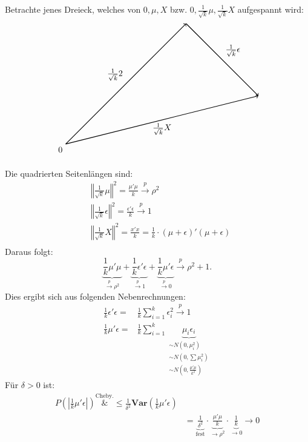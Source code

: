 \documentclass[10pt]{article}
\newcommand{\KW}{\overset{p} \longrightarrow} %
\newcommand{\Var}{\textbf{Var}} %
\begin{document}
	Betrachte jenes Dreieck, welches von $0, \mu, X$ bzw. $0, \frac{1}{\sqrt{k}} \mu, \frac{1}{\sqrt{k}} X$ aufgespannt wird:
	\begin{align*}
			\begin{tikzpicture}
			\draw[thick, ->] (0,0) node[below left] {0} -- node[midway, above left] {$\frac{1}{\sqrt{k}}\mu$} (5,5);
			\draw[thick, ->] (5,5) -- node[midway, above right] {$\frac{1}{\sqrt{k}}\epsilon$} (8,2);
			\draw[thick, ->] (0,0) -- node[midway, below] {$\frac{1}{\sqrt{k}}X$} (8,2);
		\end{tikzpicture}
	\end{align*}	
	
	Die quadrierten Seitenlängen sind:
	\begin{equation*}
		\begin{split}
			&\left\Vert \frac{1}{\sqrt{k}} \mu \right\Vert^2 = \frac{\mu'\mu}{k} \KW \rho^2\\
			&\left\Vert \frac{1}{\sqrt{k}}\epsilon \right\Vert^2= \frac{\epsilon'\epsilon}{k}\KW 1\\
			&\left\Vert \frac{1}{\sqrt{k}}X\right\Vert^2= \frac{x'x}{k} = \frac{1}{k} \cdot (\mu + \epsilon)' (\mu+\epsilon) \\
		\end{split}
	\end{equation*}
	Daraus folgt:
	\begin{equation*}
		\underbrace{\frac{1}{k} \mu' \mu}_{\KW \rho^2} + \underbrace{\frac{1}{k} \epsilon'\epsilon}_{\KW 1} + \underbrace{\frac{1}{k} \mu' \epsilon}_{\KW 0} \KW \rho^2 +1.
	\end{equation*}
	Dies ergibt sich aus folgenden Nebenrechnungen:
	\begin{equation*}
		\begin{split}
			\frac{1}{k} \epsilon' \epsilon =& \frac{1}{k} \sum_{i=1}^{k} \epsilon_i^2 \KW 1\\
			\frac{1}{k} \mu' \epsilon =& \frac{1}{k} \sum_{i=1}^{k} \underbrace{\mu_i \epsilon_i}_{\substack{
					\scriptstyle\sim N(0,\mu_i^2) \\ 
					\scriptstyle\sim N(0, \textstyle\sum \mu_i^2) \\ 
					\scriptstyle\sim N(0, \frac{\mu' \mu}{k^2})}}
		\end{split}
	\end{equation*}
	Für $\delta >0$ ist:
	\begin{equation*}
		\begin{split}
			P\left(\left\vert \frac{1}{k} \mu' \epsilon \right\vert \right) \overset{\text{Cheby.}}&{\leq} \frac{1}{\delta^2} \Var\left(\frac{1}{k} \mu' \epsilon \right)\\
			&= \underbrace{\frac{1}{\delta^2}}_{\text{fest}} \cdot \underbrace{\frac{\mu' \mu}{k}}_{\rightarrow \rho^2} \cdot \underbrace{\frac{1}{k}}_{\rightarrow 0} \rightarrow 0
		\end{split}
	\end{equation*}
\end{document}

